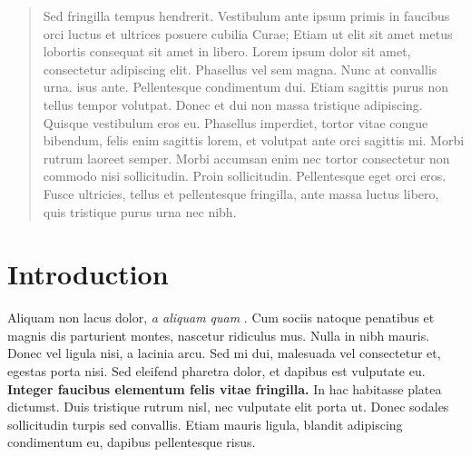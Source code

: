 \documentclass[a0,portrait]{a0poster}
\begin{document}
\begin{multicols}{2} %


\color{ku} %

\begin{abstract}

Sed fringilla tempus hendrerit. Vestibulum ante ipsum primis in faucibus orci luctus et ultrices posuere cubilia Curae; Etiam ut elit sit amet metus lobortis consequat sit amet in libero. Lorem ipsum dolor sit amet, consectetur adipiscing elit. Phasellus vel sem magna. Nunc at convallis urna. isus ante. Pellentesque condimentum dui. Etiam sagittis purus non tellus tempor volutpat. Donec et dui non massa tristique adipiscing. Quisque vestibulum eros eu. Phasellus imperdiet, tortor vitae congue bibendum, felis enim sagittis lorem, et volutpat ante orci sagittis mi. Morbi rutrum laoreet semper. Morbi accumsan enim nec tortor consectetur non commodo nisi sollicitudin. Proin sollicitudin. Pellentesque eget orci eros. Fusce ultricies, tellus et pellentesque fringilla, ante massa luctus libero, quis tristique purus urna nec nibh.

\end{abstract}


\color{SaddleBrown} %

\section*{Introduction}

Aliquam non lacus dolor, \textit{a aliquam quam} \cite{Smith:2012qr}. Cum sociis natoque penatibus et magnis dis parturient montes, nascetur ridiculus mus. Nulla in nibh mauris. Donec vel ligula nisi, a lacinia arcu. Sed mi dui, malesuada vel consectetur et, egestas porta nisi. Sed eleifend pharetra dolor, et dapibus est vulputate eu. \textbf{Integer faucibus elementum felis vitae fringilla.} In hac habitasse platea dictumst. Duis tristique rutrum nisl, nec vulputate elit porta ut. Donec sodales sollicitudin turpis sed convallis. Etiam mauris ligula, blandit adipiscing condimentum eu, dapibus pellentesque risus.


\end{multicols}
\end{document}
